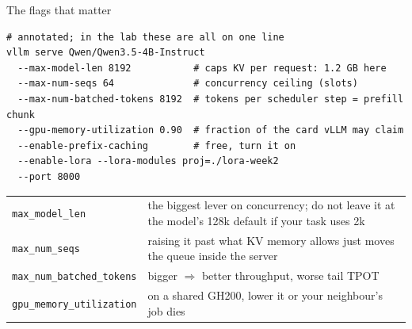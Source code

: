 \documentclass[aspectratio=169,10pt]{beamer}
\begin{document}
\begin{frame}[fragile]{The flags that matter}
\begin{lstlisting}[language=slurm]
# annotated; in the lab these are all on one line
vllm serve Qwen/Qwen3.5-4B-Instruct
  --max-model-len 8192           # caps KV per request: 1.2 GB here
  --max-num-seqs 64              # concurrency ceiling (slots)
  --max-num-batched-tokens 8192  # tokens per scheduler step = prefill chunk
  --gpu-memory-utilization 0.90  # fraction of the card vLLM may claim
  --enable-prefix-caching        # free, turn it on
  --enable-lora --lora-modules proj=./lora-week2
  --port 8000
\end{lstlisting}
  \vspace{0.3em}
  \small
  \begin{tabular}{@{}L{4.2cm} L{7.2cm}@{}}
    \texttt{max\_model\_len} & the biggest lever on concurrency; do not leave
      it at the model's 128k default if your task uses 2k\\
    \texttt{max\_num\_seqs} & raising it past what KV memory allows just moves
      the queue inside the server\\
    \texttt{max\_num\_batched\_tokens} & bigger $\Rightarrow$ better throughput,
      worse tail TPOT\\
    \texttt{gpu\_memory\_utilization} & on a shared GH200, lower it or your
      neighbour's job dies\\
  \end{tabular}
\end{frame}
\end{document}
